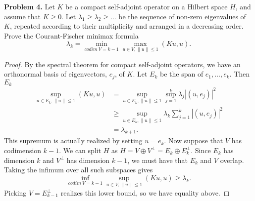 \documentclass[11pt,letterpaper]{report}
\begin{document}
\noindent\textbf{Problem 4. }Let $K$ be a compact self-adjoint operator on a Hilbert space $H$, and assume that $K\geq 0$. Let $\lambda_1 \geq \lambda_2\geq \ldots$ be the sequence of non-zero eigenvalues of $K$, repeated according to their multiplicity and arranged in a decreasing order. Prove the Courant-Fischer minimax formula
\[
\lambda_k = \min_{codim\ V= k-1}\max_{u\in V, \|u\|\leq 1}(Ku, u).
\]
\begin{proof}
	By the spectral theorem for compact self-adjoint operators, we have an orthonormal basis of eigenvectors, $e_j$, of $K$. Let $E_k$ be the span of $e_1, \ldots, e_k$. Then $E_k$
	\begin{align*}
	\sup_{u\in E_k, \|u\|\leq 1}(Ku,u) &= \sup_{u\in E_k, \|u\|\leq 1}\sup_{j=1}^k \lambda_j|(u, e_j)|^2\\
	&\geq\sup_{u\in E_k, \|u\|\leq 1} \lambda_k \sum_{j =1}^k |(u, e_j)|^2\\
	&= \lambda_{k+1}.
	\end{align*}
	This supremum is actually realized by setting $u = e_k$. Now suppose that $V$ has codimension $k-1$. We can split $H$ as $H = V\oplus V^\perp = E_k\oplus E_k^\perp$. Since $E_k$ has dimension $k$ and $V^\perp$ has dimension $k-1$, we must have that $E_k$ and $V$ overlap. Taking the infimum over all such subspaces gives
	\[
	\inf_{codim\ V = k-1}\sup_{u\in V, \|u\|\leq 1}(Ku, u) \geq \lambda_k.
	\]
	Picking $V = E_{k-1}^\perp$ realizes this lower bound, so we have equality above. 
\end{proof}
\end{document}
